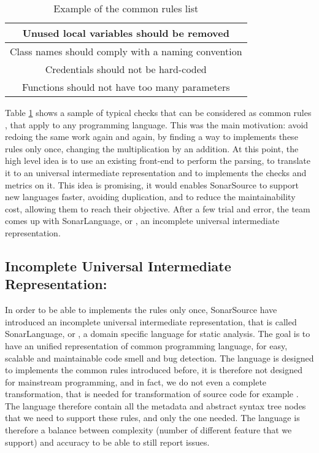 \begin{table}[h]
\centering
\caption{Example of the common rules list}
\label{table:common_rules}
	\begin{tabular}{|c|}
		\hline
		Unused local variables should be removed  \\ \hline
		Class names should comply with a naming convention \\ \hline
		Credentials should not be hard-coded \\ \hline
		Functions should not have too many parameters \\ \hline
	\end{tabular}
\end{table}

Table \ref{table:common_rules} shows a sample of typical checks that can be considered as common rules \cite{JiraSonarSource:2019:Online} , that apply to any programming language.
This was the main motivation: avoid redoing the same work again and again, by finding a way to implements these rules only once, changing the multiplication by an addition.
At this point, the high level idea is to use an existing front-end to perform the parsing, to translate it to an universal intermediate representation and to implements the checks and metrics on it.
This idea is promising, it would enables SonarSource to support new languages faster, avoiding duplication, and to reduce the maintainability cost, allowing them to reach their objective.
After a few trial and error, the team comes up with SonarLanguage, or \slang{}, an incomplete universal intermediate representation. 


\subsection{Incomplete Universal Intermediate Representation: \slang{}}
\label{subsec:slang}

In order to be able to implements the rules only once, SonarSource have introduced an incomplete universal intermediate representation, that is called SonarLanguage, or \slang{}, a domain specific language for static analysis. 
The goal is to have an unified representation of common programming language, for easy, scalable and maintainable code smell and bug detection. 
The language is designed to implements the common rules introduced before, it is therefore not designed for mainstream programming, and in fact, we do not even a complete transformation, that is needed for transformation of source code for example \cite{Koppel:2018:OTM:3288538.3276492}.
The language therefore contain all the metadata and abstract syntax tree nodes that we need to support these rules, and only the one needed.
The language is therefore a balance between complexity (number of different feature that we support) and accuracy to be able to still report issues. 

